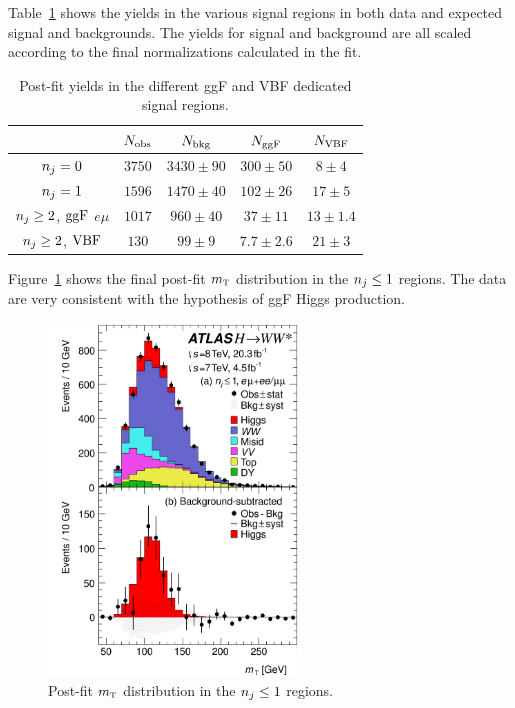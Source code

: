 Table~\ref{tab:final-yields} shows the yields in the various signal regions in both data and expected signal and backgrounds. The yields for signal and background are all scaled according to the final normalizations calculated in the fit. 


\begin{table}[h!]
\centering
\captionsetup{justification=centering}

\hspace{-10pt}
\begin{tabular}{|c|c|c|c|c|}
\hline
 & $N_{\rm obs}$ & $N_{\rm bkg}$ & $N_{\rm ggF}$ & $N_{\rm VBF}$ \\ \hline
$n_j = 0$ & $3750$ & $3430 \pm 90$ & $300 \pm 50$ & $8 \pm 4$ \\ \hline
$n_j = 1$ & $1596$ & $1470 \pm 40$ & $102 \pm 26$ & $17 \pm 5$ \\ \hline
$n_j \geq 2$, $\rm ggF$ $e\mu$ & $1017$ & $960 \pm 40$ & $37 \pm 11$ & $13 \pm 1.4$ \\ \hline
$n_j \geq 2$, $\rm VBF$ & $130$ & $99 \pm 9$ & $7.7 \pm 2.6$ & $21 \pm 3$ \\ \hline
\end{tabular}

\caption{
Post-fit yields in the different ggF and VBF dedicated signal regions\cite{WW2015}. 
}
\label{tab:final-yields}
\end{table}

Figure~\ref{fig:ggF-mT} shows the final post-fit $m_{\textrm{\footnotesize\sc t}}$ distribution in the $n_j \leq 1$ regions. The data are very consistent with the hypothesis of ggF Higgs production. 

\begin{figure}[h!]
  \centering
  \captionsetup{justification=centering}

  \includegraphics[width=0.6\textwidth]{figures/ggF_mT}
  \caption{Post-fit $m_{\textrm{\footnotesize\sc t}}$ distribution in the $n_j \leq 1$ regions\cite{WW2015}.}
  \label{fig:ggF-mT}
\end{figure}

